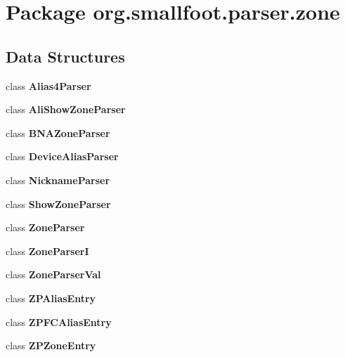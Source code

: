 \section{Package org.\-smallfoot.\-parser.\-zone}
\label{namespaceorg_1_1smallfoot_1_1parser_1_1zone}
\subsection*{Data Structures}
\begin{DoxyCompactItemize}
\item 
class {\bf Alias4\-Parser}
\item 
class {\bf Ali\-Show\-Zone\-Parser}
\item 
class {\bf B\-N\-A\-Zone\-Parser}
\item 
class {\bf Device\-Alias\-Parser}
\item 
class {\bf Nickname\-Parser}
\item 
class {\bf Show\-Zone\-Parser}
\item 
class {\bf Zone\-Parser}
\item 
class {\bf Zone\-Parser\-I}
\item 
class {\bf Zone\-Parser\-Val}
\item 
class {\bf Z\-P\-Alias\-Entry}
\item 
class {\bf Z\-P\-F\-C\-Alias\-Entry}
\item 
class {\bfseries Z\-P\-Zone\-Entry}
\end{DoxyCompactItemize}
